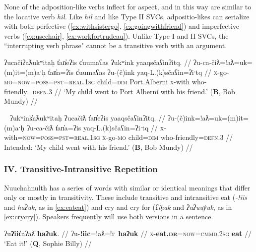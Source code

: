None of the adposition-like verbs inflect for aspect, and in this way are similar to the locative verb \textit{hił}. Like \textit{hił} and like Type II SVCs, adpositio-likes can serialize with both perfective (\ref{ex:withsistergo}, \ref{ex:goingwithfriend}) and imperfective verbs (\ref{ex:usechair}, \ref{ex:workfortrudeau}). Unlike Type I and II SVCs, the ``interrupting verb phrase" cannot be a transitive verb with an argument.

\ex \label{ex:goingwithfriend}
\begingl
\glpreamble ʔucačiʔaƛukʷitaḥ t̓an̓eʔis c̓uumaʕas ʔukʷink yaaqsčaʕinʔitq. //
\gla ʔu-ca-čiƛ=!aƛ=uk=(m)it=(m)aˑḥ t̓an̓a=ʔis c̓uumaʕas ʔu-(č)ink yaq-L.(k)sčaʕin=ʔiˑtq //
\glb \textsc{x}-go-\textsc{mo}=\textsc{now}=\textsc{poss}=\textsc{pst}=\textsc{real.1sg} child=\textsc{dim} Port.Alberni \textsc{x}-with who-friendly=\textsc{defn.3} //
\glft `My child went to Port Alberni with his friend.' (\textbf{B}, Bob Mundy) //
\endgl
\xe

\ex~ \label{ex:*goingwithfriend}
\begingl
\glpreamble *ʔukʷink̓aƛukʷitaḥ ʔucačiƛ t̓an̓eʔis yaaqsčaʕinʔitq. //
\gla ʔu-(č)ink=!aƛ=uk=(m)it=(m)aˑḥ ʔu-ca-čiƛ t̓an̓a=ʔis yaq-L.(k)sčaʕin=ʔiˑtq //
\glb \textsc{x}-with=\textsc{now}=\textsc{poss}=\textsc{pst}=\textsc{real.1sg} \textsc{x}-go-\textsc{mo} child=\textsc{dim} who-friendly=\textsc{defn.3} //
\glft Intended: `My child went with his friend.' (\textbf{B}, Bob Mundy) //
\endgl
\xe


\vspace{10pt}

\subsubsection{IV. Transitive-Intransitive Repetition}

\vspace{10pt}

Nuuchahnulth has a series of words with similar or identical meanings that differ only or mostly in transitivity. These include transitive and intransitive eat (\textit{-!iis} and \textit{haʔuk}, as in \ref{ex:eateat}) and cry and cry for (\textit{ʕiḥak} and \textit{ʔuʔuuy̓uk}, as in \ref{ex:crycry}). Speakers frequently will use both versions in a sentence.

\ex \label{ex:eateat}
\begingl
\glpreamble ʔu\textbf{ʔiic̓}aʔaƛ̓ \textbf{haʔuk}. //
\gla ʔu-\textbf{!iic}=!aƛ=!iˑ \textbf{haʔuk} //
\glb \textsc{x}-\textbf{eat.\textsc{dr}}=\textsc{now}=\textsc{cmmd.2sg} \textbf{eat} //
\glft `Eat it!' (\textbf{Q}, Sophie Billy) //
\endgl
\xe

